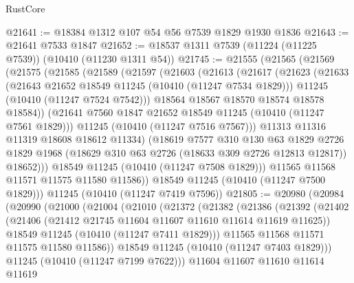 \begin{lexlean}{RustCore}
\begin{coremodule}
@21641 := @18384 @1312 @107 @54 @56 @7539 @1829 @1930 @1836
@21643 := @21641 @7533 @1847
@21652 := @18537 @1311 @7539 (@11224 (@11225 @7539)) (@10410 (@11230 @1311 @54))
@21745 := @21555
    (@21565
      (@21569
        (@21575
          (@21585
            (@21589
              (@21597
                (@21603
                  (@21613
                    (@21617
                      (@21623
                        (@21633
                          (@21643 @21652 @18549 @11245 (@10410 (@11247 @7534 @1829)))
                          @11245
                          (@10410 (@11247 @7524 @7542)))
                        @18564
                        @18567
                        @18570
                        @18574
                        @18578
                        @18584))
                    (@21641 @7560 @1847 @21652 @18549 @11245 (@10410 (@11247 @7561 @1829)))
                    @11245
                    (@10410 (@11247 @7516 @7567)))
                  @11313
                  @11316
                  @11319
                  @18608
                  @18612
                  @11334)
                (@18619
                  @7577
                  @310
                  @130
                  @63
                  @1829
                  @2726
                  @1829
                  @1968
                  (@18629 @310 @63 @2726 (@18633 @309 @2726 @12813 @12817))
                  @18652)))
            @18549
            @11245
            (@10410 (@11247 @7508 @1829)))
          @11565
          @11568
          @11571
          @11575
          @11580
          @11586))
      @18549
      @11245
      (@10410 (@11247 @7500 @1829)))
    @11245
    (@10410 (@11247 @7419 @7596))
@21805 := @20980
    (@20984
      (@20990
        (@21000
          (@21004
            (@21010
              (@21372
                (@21382
                  (@21386
                    (@21392
                      (@21402
                        (@21406 (@21412 @21745 @11604 @11607 @11610 @11614 @11619 @11625))
                        @18549
                        @11245
                        (@10410 (@11247 @7411 @1829)))
                      @11565
                      @11568
                      @11571
                      @11575
                      @11580
                      @11586))
                  @18549
                  @11245
                  (@10410 (@11247 @7403 @1829)))
                @11245
                (@10410 (@11247 @7199 @7622)))
              @11604
              @11607
              @11610
              @11614
              @11619

\end{coremodule}
\end{lexlean}
